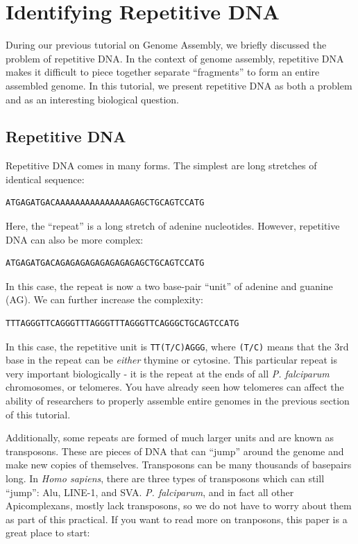 \documentclass[11pt]{article}
\begin{document}
    \hypertarget{identifying-repetitive-dna}{%
\section{Identifying Repetitive DNA}\label{identifying-repetitive-dna}}

During our previous tutorial on Genome Assembly, we briefly discussed
the problem of repetitive DNA. In the context of genome assembly,
repetitive DNA makes it difficult to piece together separate
``fragments'' to form an entire assembled genome. In this tutorial, we
present repetitive DNA as both a problem and as an interesting
biological question.

    \hypertarget{repetitive-dna}{%
\subsection{Repetitive DNA}\label{repetitive-dna}}

Repetitive DNA comes in many forms. The simplest are long stretches of
identical sequence:

\begin{verbatim}
ATGAGATGACAAAAAAAAAAAAAAAGAGCTGCAGTCCATG
\end{verbatim}

Here, the ``repeat'' is a long stretch of adenine nucleotides. However,
repetitive DNA can also be more complex:

\begin{verbatim}
ATGAGATGACAGAGAGAGAGAGAGAGAGCTGCAGTCCATG
\end{verbatim}

In this case, the repeat is now a two base-pair ``unit'' of adenine and
guanine (AG). We can further increase the complexity:

\begin{verbatim}
TTTAGGGTTCAGGGTTTAGGGTTTAGGGTTCAGGGCTGCAGTCCATG
\end{verbatim}

In this case, the repetitive unit is \texttt{TT(T/C)AGGG}, where
\texttt{(T/C)} means that the 3rd base in the repeat can be
\textit{either} thymine or cytosine. This particular repeat is very
important biologically - it is the repeat at the ends of all \textit{P.
falciparum} chromosomes, or telomeres. You have already seen how
telomeres can affect the ability of researchers to properly assemble
entire genomes in the previous section of this tutorial.

Additionally, some repeats are formed of much larger units and are known
as transposons. These are pieces of DNA that can ``jump'' around the
genome and make new copies of themselves. Transposons can be many
thousands of basepairs long. In \textit{Homo sapiens}, there are three
types of transposons which can still ``jump'': Alu, LINE-1, and SVA.
\textit{P. falciparum}, and in fact all other Apicomplexans, mostly lack
transposons, so we do not have to worry about them as part of this
practical. If you want to read more on tranposons, this paper is a great
place to start:
\end{document}
